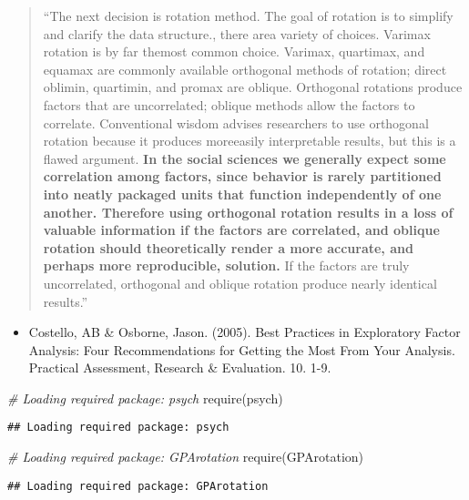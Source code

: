 \documentclass[
]{article}
\newenvironment{Shaded}{\begin{snugshade}}{\end{snugshade}}
\newcommand{\CommentTok}[1]{\textcolor[rgb]{0.56,0.35,0.01}{\textit{#1}}}
\newcommand{\FunctionTok}[1]{\textcolor[rgb]{0.00,0.00,0.00}{#1}}
\newcommand{\NormalTok}[1]{#1}
\providecommand{\tightlist}{%
  \setlength{\itemsep}{0pt}\setlength{\parskip}{0pt}}
\begin{document}
\begin{quote}
``The next decision is rotation method. The goal of rotation is to
simplify and clarify the data structure., there area variety of choices.
Varimax rotation is by far themost common choice. Varimax, quartimax,
and equamax are commonly available orthogonal methods of rotation;
direct oblimin, quartimin, and promax are oblique. Orthogonal rotations
produce factors that are uncorrelated; oblique methods allow the factors
to correlate. Conventional wisdom advises researchers to use orthogonal
rotation because it produces moreeasily interpretable results, but this
is a flawed argument. \textbf{In the social sciences we generally expect
some correlation among factors, since behavior is rarely partitioned
into neatly packaged units that function independently of one another.
Therefore using orthogonal rotation results in a loss of valuable
information if the factors are correlated, and oblique rotation should
theoretically render a more accurate, and perhaps more reproducible,
solution.} If the factors are truly uncorrelated, orthogonal and oblique
rotation produce nearly identical results.''
\end{quote}

\begin{itemize}
\tightlist
\item
  Costello, AB \& Osborne, Jason. (2005). Best Practices in Exploratory
  Factor Analysis: Four Recommendations for Getting the Most From Your
  Analysis. Practical Assessment, Research \& Evaluation. 10. 1-9.
\end{itemize}

\begin{Shaded}
\begin{Highlighting}[]
\CommentTok{\# Loading required package: psych}
\FunctionTok{require}\NormalTok{(psych)}
\end{Highlighting}
\end{Shaded}

\begin{verbatim}
## Loading required package: psych
\end{verbatim}

\begin{Shaded}
\begin{Highlighting}[]
\CommentTok{\# Loading required package: GPArotation}
\FunctionTok{require}\NormalTok{(GPArotation)}
\end{Highlighting}
\end{Shaded}

\begin{verbatim}
## Loading required package: GPArotation
\end{verbatim}
\end{document}
